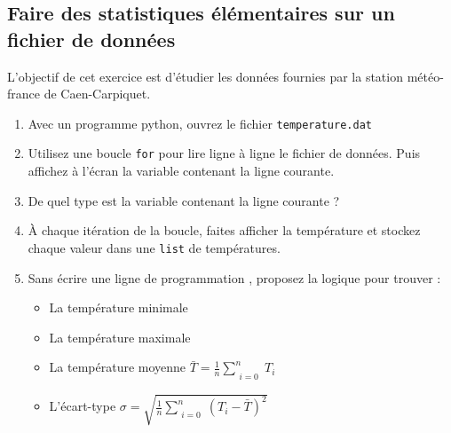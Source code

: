 

\subsection{Faire des statistiques élémentaires sur un fichier de données}

L'objectif de cet exercice est d'étudier les données fournies par la station météo-france
de Caen-Carpiquet.
\begin{enumerate}
\item Avec un programme python, ouvrez le fichier \texttt{temperature.dat}

\item Utilisez une boucle \texttt{for} pour lire ligne à ligne le fichier de données.
  Puis affichez à l'écran la variable contenant la ligne courante.

\item De quel type est la variable contenant la ligne courante ?


\item À chaque itération de la boucle, faites afficher la température et stockez chaque valeur dans une \texttt{list} de températures.

\item Sans écrire une ligne de programmation , proposez la logique pour trouver :
  \begin{itemize}
  \item La température minimale
  \item La température maximale
  \item La température moyenne    $ \bar{T}= \frac{1}{n}  \sum\limits_{\substack{i=0}}^{n}{T_i}$
  \item L'écart-type  $\sigma = \sqrt{\frac{1}{n}  \sum\limits_{\substack{i=0}}^{n}{} (T_i-\bar{T})^2   }$
  \end{itemize}


\end{enumerate}
